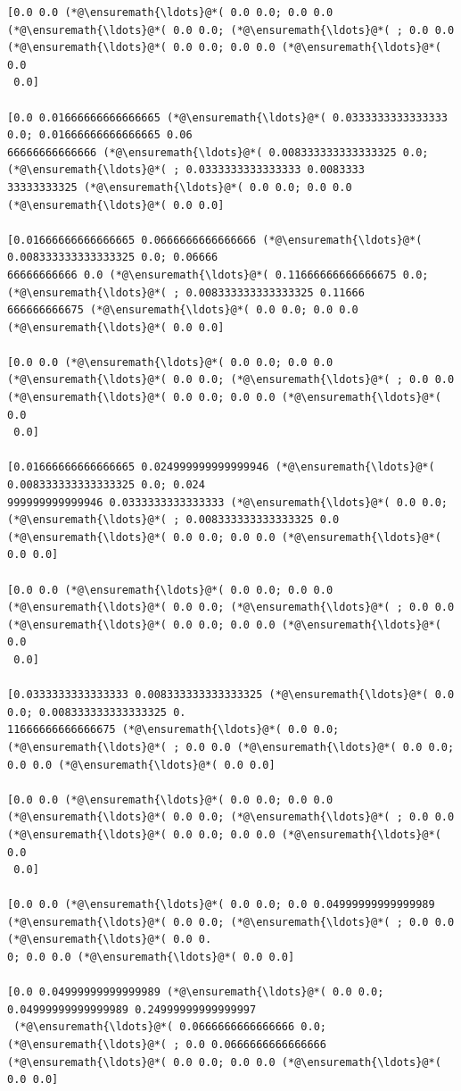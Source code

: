 \documentclass[12pt,a4paper]{article}
\begin{document}
\begin{lstlisting}
[0.0 0.0 (*@\ensuremath{\ldots}@*( 0.0 0.0; 0.0 0.0 (*@\ensuremath{\ldots}@*( 0.0 0.0; (*@\ensuremath{\ldots}@*( ; 0.0 0.0 (*@\ensuremath{\ldots}@*( 0.0 0.0; 0.0 0.0 (*@\ensuremath{\ldots}@*( 0.0
 0.0]

[0.0 0.01666666666666665 (*@\ensuremath{\ldots}@*( 0.0333333333333333 0.0; 0.01666666666666665 0.06
66666666666666 (*@\ensuremath{\ldots}@*( 0.008333333333333325 0.0; (*@\ensuremath{\ldots}@*( ; 0.0333333333333333 0.0083333
33333333325 (*@\ensuremath{\ldots}@*( 0.0 0.0; 0.0 0.0 (*@\ensuremath{\ldots}@*( 0.0 0.0]

[0.01666666666666665 0.0666666666666666 (*@\ensuremath{\ldots}@*( 0.008333333333333325 0.0; 0.06666
66666666666 0.0 (*@\ensuremath{\ldots}@*( 0.11666666666666675 0.0; (*@\ensuremath{\ldots}@*( ; 0.008333333333333325 0.11666
666666666675 (*@\ensuremath{\ldots}@*( 0.0 0.0; 0.0 0.0 (*@\ensuremath{\ldots}@*( 0.0 0.0]

[0.0 0.0 (*@\ensuremath{\ldots}@*( 0.0 0.0; 0.0 0.0 (*@\ensuremath{\ldots}@*( 0.0 0.0; (*@\ensuremath{\ldots}@*( ; 0.0 0.0 (*@\ensuremath{\ldots}@*( 0.0 0.0; 0.0 0.0 (*@\ensuremath{\ldots}@*( 0.0
 0.0]

[0.01666666666666665 0.024999999999999946 (*@\ensuremath{\ldots}@*( 0.008333333333333325 0.0; 0.024
999999999999946 0.0333333333333333 (*@\ensuremath{\ldots}@*( 0.0 0.0; (*@\ensuremath{\ldots}@*( ; 0.008333333333333325 0.0 
(*@\ensuremath{\ldots}@*( 0.0 0.0; 0.0 0.0 (*@\ensuremath{\ldots}@*( 0.0 0.0]

[0.0 0.0 (*@\ensuremath{\ldots}@*( 0.0 0.0; 0.0 0.0 (*@\ensuremath{\ldots}@*( 0.0 0.0; (*@\ensuremath{\ldots}@*( ; 0.0 0.0 (*@\ensuremath{\ldots}@*( 0.0 0.0; 0.0 0.0 (*@\ensuremath{\ldots}@*( 0.0
 0.0]

[0.0333333333333333 0.008333333333333325 (*@\ensuremath{\ldots}@*( 0.0 0.0; 0.008333333333333325 0.
11666666666666675 (*@\ensuremath{\ldots}@*( 0.0 0.0; (*@\ensuremath{\ldots}@*( ; 0.0 0.0 (*@\ensuremath{\ldots}@*( 0.0 0.0; 0.0 0.0 (*@\ensuremath{\ldots}@*( 0.0 0.0]

[0.0 0.0 (*@\ensuremath{\ldots}@*( 0.0 0.0; 0.0 0.0 (*@\ensuremath{\ldots}@*( 0.0 0.0; (*@\ensuremath{\ldots}@*( ; 0.0 0.0 (*@\ensuremath{\ldots}@*( 0.0 0.0; 0.0 0.0 (*@\ensuremath{\ldots}@*( 0.0
 0.0]

[0.0 0.0 (*@\ensuremath{\ldots}@*( 0.0 0.0; 0.0 0.04999999999999989 (*@\ensuremath{\ldots}@*( 0.0 0.0; (*@\ensuremath{\ldots}@*( ; 0.0 0.0 (*@\ensuremath{\ldots}@*( 0.0 0.
0; 0.0 0.0 (*@\ensuremath{\ldots}@*( 0.0 0.0]

[0.0 0.04999999999999989 (*@\ensuremath{\ldots}@*( 0.0 0.0; 0.04999999999999989 0.24999999999999997
 (*@\ensuremath{\ldots}@*( 0.0666666666666666 0.0; (*@\ensuremath{\ldots}@*( ; 0.0 0.0666666666666666 (*@\ensuremath{\ldots}@*( 0.0 0.0; 0.0 0.0 (*@\ensuremath{\ldots}@*( 
0.0 0.0]


\end{lstlisting}
\end{document}
